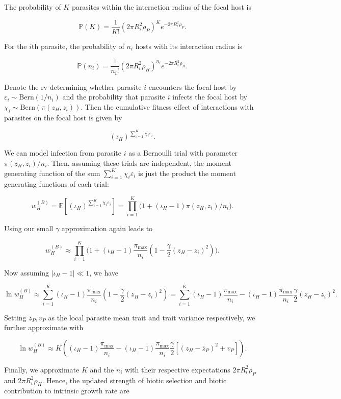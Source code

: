 \documentclass[
]{article}
\begin{document}
The probability of \(K\) parasites within the interaction radius of the
focal host is

\[\mathbb P(K)=\frac{1}{K!}(2\pi R_\iota^2\rho_P)^Ke^{-2\pi R_\iota^2\rho_P}.\]

For the \(i\)th parasite, the probability of \(n_i\) hosts with its
interaction radius is

\[\mathbb P(n_i)=\frac{1}{n_i!}(2\pi R_\iota^2\rho_H)^{n_i}e^{-2\pi R_\iota^2\rho_H}.\]

Denote the rv determining whether parasite \(i\) encounters the focal
host by \(\varepsilon_i\sim\mathrm{Bern}(1/n_i)\) and the probability
that parasite \(i\) infects the focal host by
\(\chi_i\sim\mathrm{Bern}(\pi(z_H,z_i))\). Then the cumulative fitness
effect of interactions with parasites on the focal host is given by

\[(\iota_H)^{\sum_{i=1}^K\chi_i\varepsilon_i}.\]

We can model infection from parasite \(i\) as a Bernoulli trial with
parameter \(\pi(z_H,z_i)/n_i\). Then, assuming these trials are
independent, the moment generating function of the sum
\(\sum_{i=1}^K\chi_i\varepsilon_i\) is just the product the moment
generating functions of each trial:

\[w_H^{(B)}=\mathbb E[(\iota_H)^{\sum_{i=1}^K\chi_i\varepsilon_i}]=\prod_{i=1}^K\Big(1+(\iota_H-1)\pi(z_H,z_i)/n_i\Big).\]

Using our small \(\gamma\) approximation again leads to

\[w_H^{(B)}\approx\prod_{i=1}^K\Big(1+(\iota_H-1)\frac{\pi_{\max}}{n_i}\left(1-\frac{\gamma}{2}(z_H-z_i)^2\right)\Big).\]

Now assuming \(|\iota_H-1|\ll1\), we have

\[\ln w_H^{(B)}\approx\sum_{i=1}^K(\iota_H-1)\frac{\pi_{\max}}{n_i}\left(1-\frac{\gamma}{2}(z_H-z_i)^2\right)=\sum_{i=1}^K(\iota_H-1)\frac{\pi_{\max}}{n_i}-(\iota_H-1)\frac{\pi_{\max}}{n_i}\frac{\gamma}{2}(z_H-z_i)^2.\]

Setting \(\bar z_P, v_P\) as the local parasite mean trait and trait
variance respectively, we further approximate with

\[\ln w_H^{(B)}\approx K\left((\iota_H-1)\frac{\pi_{\max}}{n_i}-(\iota_H-1)\frac{\pi_{\max}}{n_i}\frac{\gamma}{2}[(z_H-\bar z_P)^2+v_P]\right).\]

Finally, we approximate \(K\) and the \(n_i\) with their respective
expectations \(2\pi R_\iota^2\rho_P\) and \(2\pi R_\iota^2\rho_H\).
Hence, the updated strength of biotic selection and biotic contribution
to intrinsic growth rate are
\end{document}
